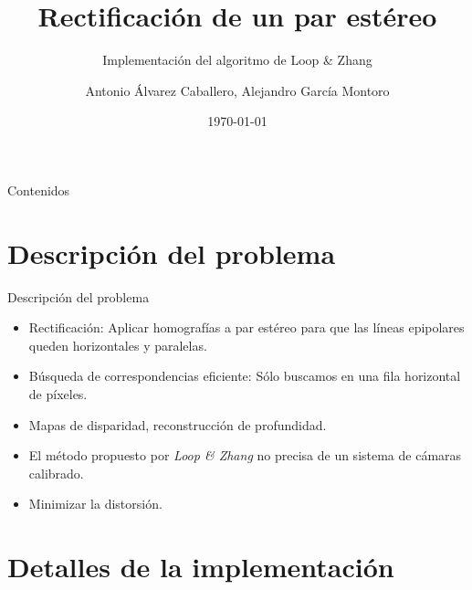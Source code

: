 \documentclass[14pt,spanish]{beamer}
\title[Rectificación]{Rectificación de un par estéreo}
\subtitle[Implementación de Loop Zhang]{Implementación del algoritmo de Loop \& Zhang}
\author[A. A. Caballero, A. G. Montoro]{Antonio Álvarez Caballero, Alejandro García Montoro}
\institute[UGR]{Universidad de Granada}
\date{\today}
\begin{document}
    \titlepage

    \begin{frame}[t]{Contenidos}
        \tableofcontents
    \end{frame}

    \section{Descripción del problema}

    \begin{frame}{Descripción del problema}{}

        \begin{itemize}[<+->]
            \item Rectificación: Aplicar homografías a par estéreo para que las líneas
              epipolares queden horizontales y paralelas.
            \item Búsqueda de correspondencias eficiente: Sólo buscamos en una fila
              horizontal de píxeles.
            \item Mapas de disparidad, reconstrucción de profundidad.
            \item El método propuesto por \emph{Loop \& Zhang} no precisa de un sistema
              de cámaras calibrado.
            \item Minimizar la distorsión.
        \end{itemize}

    \end{frame}

    \section{Detalles de la implementación}
\end{document}
